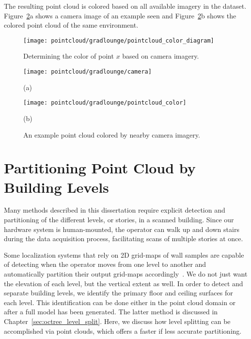 \documentclass[12pt,onecolumn,oneside]{book}
\begin{document}
The resulting point cloud is colored based on all available imagery in the dataset.  Figure~\ref{fig:pointcloud_color}a shows a camera image of an example seen and Figure~\ref{fig:pointcloud_color}b shows the colored point cloud of the same environment.

\begin{figure}
	\centerline{\texttt{[image: pointcloud/gradlounge/pointcloud\_color\_diagram]}}
	\caption{Determining the color of point $x$ based on camera imagery.}
	\label{fig:pointcloud_color_diagram}
\end{figure}

\begin{figure}
	\begin{minipage}[t]{0.5\linewidth}
		\centerline{\texttt{[image: pointcloud/gradlounge/camera]}}
		\centerline{(a)}
	\end{minipage}
	\hfill
	\begin{minipage}[t]{0.5\linewidth}
		\centerline{\texttt{[image: pointcloud/gradlounge/pointcloud\_color]}}
		\centerline{(b)}
	\end{minipage}

	\caption{An example point cloud colored by nearby camera imagery.}
	\label{fig:pointcloud_color}
\end{figure}

\section{Partitioning Point Cloud by Building Levels}
\label{sec:pointcloud_level_split}

Many methods described in this dissertation require explicit detection and partitioning of the different levels, or stories, in a scanned building.  Since our hardware system is human-mounted, the operator can walk up and down stairs during the data acquisition process, facilitating scans of multiple stories at once.  

Some localization systems that rely on 2D grid-maps of wall samples are capable of detecting when the operator moves from one level to another and automatically partition their output grid-maps accordingly~\cite{MITBackpack}.  We do not just want the elevation of each level, but the vertical extent as well.  In order to detect and separate building levels, we identify the primary floor and ceiling surfaces for each level.  This identification can be done either in the point cloud domain or after a full model has been generated.  The latter method is discussed in Chapter~\ref{sec:octree_level_split}.  Here, we discuss how level splitting can be accomplished via point clouds, which offers a faster if less accurate partitioning.
\end{document}
